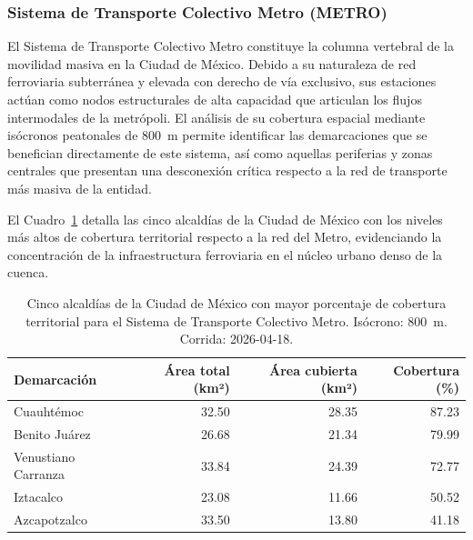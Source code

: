 
\subsubsection{Sistema de Transporte Colectivo Metro (METRO)}
\label{subsubsec:cobertura-metro}

El Sistema de Transporte Colectivo Metro constituye la columna vertebral de la
movilidad masiva en la Ciudad de México. Debido a su naturaleza de red ferroviaria
subterránea y elevada con derecho de vía exclusivo, sus estaciones actúan como
nodos estructurales de alta capacidad que articulan los flujos intermodales de la
metrópoli. El análisis de su cobertura espacial mediante isócronos peatonales de
800~m permite identificar las demarcaciones que se benefician directamente de este
sistema, así como aquellas periferias y zonas centrales que presentan una
desconexión crítica respecto a la red de transporte más masiva de la entidad.

El Cuadro~\ref{tab:cobertura-metro-cdmx} detalla las cinco alcaldías de la Ciudad de
México con los niveles más altos de cobertura territorial respecto a la red del
Metro, evidenciando la concentración de la infraestructura ferroviaria en el núcleo
urbano denso de la cuenca.

\begin{table}[H]
    \centering
    \caption[Alcaldías con mayor cobertura del STC Metro (CDMX)]{
    Cinco alcaldías de la Ciudad de México con mayor porcentaje de cobertura
    territorial para el Sistema de Transporte Colectivo Metro. Isócrono: 800~m.
    Corrida: 2026-04-18.}
    \label{tab:cobertura-metro-cdmx}
    \begin{tabular}{|l|r|r|r|}
        \hline
        \textbf{Demarcación} & \textbf{Área total (km²)} & \textbf{Área cubierta (km²)} & \textbf{Cobertura (\%)} \\
        \hline
        Cuauhtémoc          & 32.50 &  28.35 &  87.23 \\
        Benito Juárez       & 26.68 &  21.34 &  79.99 \\
        Venustiano Carranza & 33.84 &  24.39 &  72.77 \\
        Iztacalco           & 23.08 &  11.66 &  50.52 \\
        Azcapotzalco        & 33.50 &  13.80 &  41.18 \\
        \hline
    \end{tabular}
\end{table}

